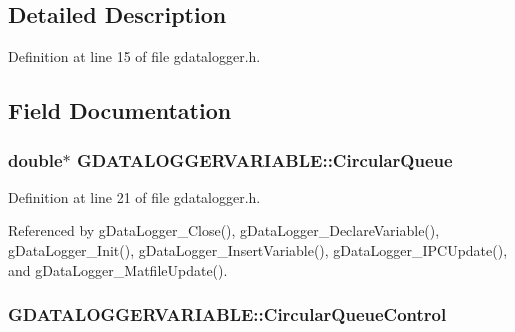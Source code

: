 \subsection{Detailed Description}


Definition at line 15 of file gdatalogger.\-h.



\subsection{Field Documentation}
\hypertarget{structGDATALOGGERVARIABLE_ae17ad02442f31da9518c99ce13607c8b}{
\subsubsection[{Circular\-Queue}]{\setlength{\rightskip}{0pt plus 5cm}double$\ast$ G\-D\-A\-T\-A\-L\-O\-G\-G\-E\-R\-V\-A\-R\-I\-A\-B\-L\-E\-::\-Circular\-Queue}}\label{structGDATALOGGERVARIABLE_ae17ad02442f31da9518c99ce13607c8b}


Definition at line 21 of file gdatalogger.\-h.



Referenced by g\-Data\-Logger\-\_\-\-Close(), g\-Data\-Logger\-\_\-\-Declare\-Variable(), g\-Data\-Logger\-\_\-\-Init(), g\-Data\-Logger\-\_\-\-Insert\-Variable(), g\-Data\-Logger\-\_\-\-I\-P\-C\-Update(), and g\-Data\-Logger\-\_\-\-Matfile\-Update().

\hypertarget{structGDATALOGGERVARIABLE_a1a50747d2223f228288b4656470d9bbc}{
\subsubsection[{Circular\-Queue\-Control}]{ G\-D\-A\-T\-A\-L\-O\-G\-G\-E\-R\-V\-A\-R\-I\-A\-B\-L\-E\-::\-Circular\-Queue\-Control}}\label{structGDATALOGGERVARIABLE_a1a50747d2223f228288b4656470d9bbc}


